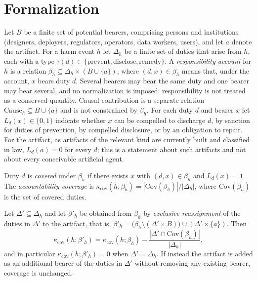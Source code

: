 \section*{Formalization}

Let $B$ be a finite set of potential bearers, comprising persons and institutions (designers, deployers, regulators, operators, data workers, users), and let $a$ denote the artifact. For a harm event $h$ let $\Delta_h$ be a finite set of duties that arise from $h$, each with a type $\tau(d)\in\{\text{prevent},\text{disclose},\text{remedy}\}$. A \emph{responsibility account} for $h$ is a relation $\beta_h\subseteq\Delta_h\times(B\cup\{a\})$, where $(d,x)\in\beta_h$ means that, under the account, $x$ bears duty $d$. Several bearers may bear the same duty and one bearer may bear several, and no normalization is imposed: responsibility is not treated as a conserved quantity. Causal contribution is a separate relation $\mathrm{Cause}_h\subseteq B\cup\{a\}$ and is not constrained by $\beta_h$. For each duty $d$ and bearer $x$ let $L_d(x)\in\{0,1\}$ indicate whether $x$ can be compelled to discharge $d$, by sanction for duties of prevention, by compelled disclosure, or by an obligation to repair. For the artifact, as artifacts of the relevant kind are currently built and classified in law, $L_d(a)=0$ for every $d$; this is a statement about such artifacts and not about every conceivable artificial agent.

\begin{definition}[Coverage]
Duty $d$ is \emph{covered} under $\beta_h$ if there exists $x$ with $(d,x)\in\beta_h$ and $L_d(x)=1$. The \emph{accountability coverage} is $\kappa_{\mathrm{cov}}(h;\beta_h)=|\mathrm{Cov}(\beta_h)|/|\Delta_h|$, where $\mathrm{Cov}(\beta_h)$ is the set of covered duties.
\end{definition}

\begin{proposition}
Let $\Delta'\subseteq\Delta_h$ and let $\beta'_h$ be obtained from $\beta_h$ by \emph{exclusive reassignment} of the duties in $\Delta'$ to the artifact, that is, $\beta'_h=\big(\beta_h\setminus(\Delta'\times B)\big)\cup(\Delta'\times\{a\})$. Then
\[
\kappa_{\mathrm{cov}}(h;\beta'_h)=\kappa_{\mathrm{cov}}(h;\beta_h)-\frac{|\Delta'\cap\mathrm{Cov}(\beta_h)|}{|\Delta_h|},
\]
and in particular $\kappa_{\mathrm{cov}}(h;\beta'_h)=0$ when $\Delta'=\Delta_h$. If instead the artifact is added as an additional bearer of the duties in $\Delta'$ without removing any existing bearer, coverage is unchanged.
\end{proposition}

